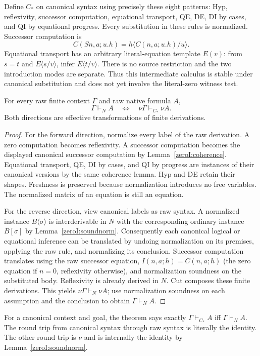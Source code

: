 Define $C_*$ on canonical syntax using precisely these eight patterns:
Hyp, reflexivity, successor computation, equational transport, QE, DE,
DI by cases, and QI by equational progress.  Every substitution in these
rules is normalized.  Successor computation is
\[
 C(Sn,a;u.h)=h\langle C(n,a;u.h)/u\rangle.
\]
Equational transport has an arbitrary literal-equation template $E(v)$:
from $s=t$ and $E\langle s/v\rangle$, infer
$E\langle t/v\rangle$.  There is no source restriction and the two
introduction modes are separate.  Thus this intermediate calculus is
stable under canonical substitution and does not yet involve the
literal-zero witness test.

\begin{theorem}\label{zeroI:equivalence}
For every raw finite context $\Gamma$ and raw native formula $A$,
\[
 \Gamma\vdash_N A
 \quad\Longleftrightarrow\quad
 \nu\Gamma\vdash_{C_*}\nu A.
\]
Both directions are effective transformations of finite derivations.
\end{theorem}
\begin{proof}
For the forward direction, normalize every label of the raw derivation.
A zero computation becomes reflexivity.  A successor computation becomes
the displayed canonical successor computation by
Lemma~\ref{zeroI:coherence}.  Equational transport, QE, DI by cases, and
QI by progress are instances of their canonical versions by the same
coherence lemma.  Hyp and DE retain their shapes.  Freshness is preserved
because normalization introduces no free variables.  The normalized
matrix of an equation is still an equation.

For the reverse direction, view canonical labels as raw syntax.  A
normalized instance $B\langle\sigma\rangle$ is interderivable in $N$
with the corresponding ordinary instance $B[\sigma]$ by
Lemma~\ref{zeroI:soundnorm}.  Consequently each canonical logical or
equational inference can be translated by undoing normalization on its
premises, applying the raw rule, and normalizing its conclusion.
Successor computation translates using the raw successor equation,
$I(n,a;h)=C(n,a;h)$ (the zero equation if $n=0$, reflexivity otherwise),
and normalization soundness on the substituted body.  Reflexivity is
already derived in $N$.  Cut composes these finite derivations.
This yields $\nu\Gamma\vdash_N\nu A$; use normalization soundness on
each assumption and the conclusion to obtain $\Gamma\vdash_N A$.
\end{proof}

For a canonical context and goal, the theorem says exactly
$\Gamma\vdash_{C_*}A$ iff $\Gamma\vdash_NA$.  The round trip from
canonical syntax through raw syntax is literally the identity.  The
other round trip is $\nu$ and is internally the identity by
Lemma~\ref{zeroI:soundnorm}.

